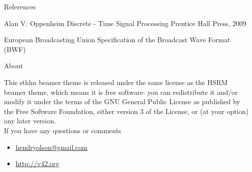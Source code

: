 \documentclass[newPxFont]{beamer}
\begin{document}
\begin{frame}{References}
	\begin{thebibliography}{10}

	\beamertemplatebookbibitems
	Alan V. Oppenheim
	\newblock Discrete - Time Signal Processing
	\newblock Prentice Hall Press, 2009

	\beamertemplatearticlebibitems
	European Broadcasting Union
	\newblock Specification of the Broadcast Wave Format (BWF)

  \end{thebibliography}
\end{frame}

%
%

\begin{frame}{About}

This sthlm beamer theme is released under the same license as the HSRM beamer theme, which means it is free software: you can redistribute it and/or modify
it under the terms of the GNU General Public License as published by
the Free Software Foundation, either version 3 of the License, or
(at your option) any later version.\\

If you have any questions or comments
\begin{itemize}
	\item \url{hendryolson@gmail.com}
    \item \url{http://v42.org}
\end{itemize}
\end{frame}
\end{document}
